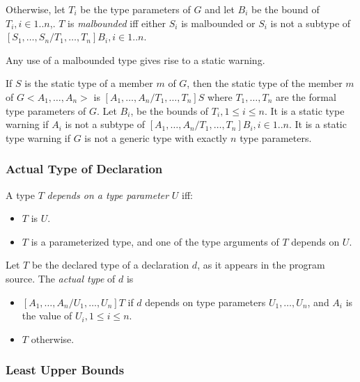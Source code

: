 \documentclass{article}
\begin{document}
\begin{itemize}
\LMHash{}
Otherwise, let
 $T_i$ be the type parameters of $G$ and let $B_i$ be the bound of $T_i,  i \in 1.. n$,. $T$ is {\em malbounded} iff either $S_i$ is malbounded  or $S_i$ is not a subtype of $[S_1,  \ldots, S_n/T_1, \ldots, T_n]B_i,   i \in 1.. n$.


\LMHash{}
Any use of a malbounded type gives rise to a static warning.

\LMHash{}
If $S$ is the static type of a member $m$ of $G$, then the static type of the member $m$ of  $G<A_1, \ldots, A_n>$  is $[A_1,  \ldots, A_n/T_1,  \ldots, T_n]S$ where $T_1,  \ldots, T_n$ are the formal type parameters of $G$.   Let $B_i$, be the bounds of $T_i, 1 \le i \le n$. It is a static type warning if $A_i$ is not a subtype of  $[A_1,  \ldots, A_n/T_1,  \ldots, T_n]B_i, i \in 1..n$. It is a static type warning if $G$ is not a generic type with exactly $n$ type parameters.





\subsubsection{Actual Type of Declaration}

\LMHash{}
A type $T$ {\em depends on a type parameter} $U$ iff:
\begin{itemize}
\item $T$ is $U$.
\item $T$ is a parameterized type, and one of the type arguments of $T$ depends on $U$.
\end{itemize}

\LMHash{}
Let $T$ be the declared type of a declaration $d$, as it appears in the program source. The {\em actual type} of $d$ is

\begin{itemize}
\item  $[A_1, \ldots, A_n/U_1, \ldots, U_n]T$ if $d$ depends on type parameters $U_1, \ldots, U_n$, and $A_i$ is the value of $U_i, 1 \le i \le n$.
\item $T$ otherwise.
\end{itemize}

\subsubsection{Least Upper Bounds}


\end{itemize}
\end{document}
